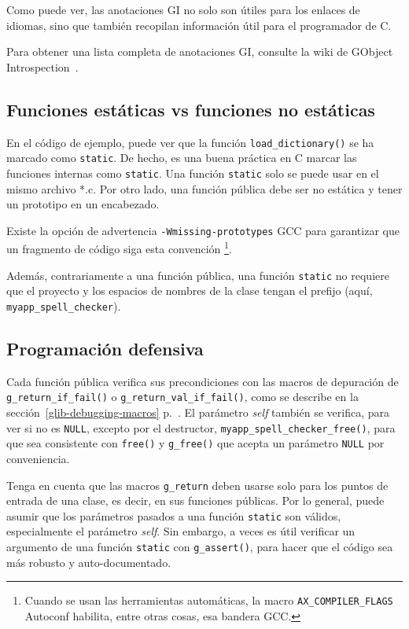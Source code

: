 Como puede ver, las anotaciones GI no solo son útiles para los enlaces de idiomas, sino que también recopilan información útil para el programador de C.

Para obtener una lista completa de anotaciones GI, consulte la wiki de GObject Introspection~\cite{gobject-introspection}.

\subsection{Funciones estáticas vs funciones no estáticas}
En el código de ejemplo, puede ver que la función \lstinline{load_dictionary()} se ha marcado como \lstinline{static}. De hecho, es una buena práctica en C marcar las funciones internas como \lstinline{static}. Una función \lstinline{static} solo se puede usar en el mismo archivo *.c. Por otro lado, una función pública debe ser no estática y tener un prototipo en un encabezado.

Existe la opción de advertencia \texttt{-Wmissing-prototypes} GCC para garantizar que un fragmento de código siga esta convención \footnote{Cuando se usan las herramientas automáticas, la macro \texttt{AX\_COMPILER\_FLAGS} Autoconf habilita, entre otras cosas, esa bandera GCC.}.

Además, contrariamente a una función pública, una función \lstinline{static} no requiere que el proyecto y los espacios de nombres de la clase tengan el prefijo (aquí, \lstinline{myapp_spell_checker}).

\subsection{Programación defensiva}
Cada función pública verifica sus precondiciones con las macros de depuración de \lstinline{g_return_if_fail()} o \lstinline{g_return_val_if_fail()}, como se describe en la sección~\ref{glib-debugging-macros} p.~\pageref{glib-debugging-macros}. El parámetro \emph{self} también se verifica, para ver si no es \lstinline{NULL}, excepto por el destructor, \lstinline{myapp_spell_checker_free()}, para que sea consistente con \lstinline{free()} y \lstinline{g_free()} que acepta un parámetro \lstinline{NULL} por conveniencia.

Tenga en cuenta que las macros \lstinline{g_return} deben usarse solo para los puntos de entrada de una clase, es decir, en sus funciones públicas. Por lo general, puede asumir que los parámetros pasados a una función \lstinline{static} son válidos, especialmente el parámetro \emph{self}. Sin embargo, a veces es útil verificar un argumento de una función \lstinline{static} con \lstinline{g_assert()}, para hacer que el código sea más robusto y auto-documentado.

